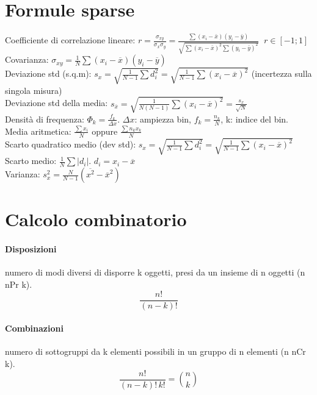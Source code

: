 \documentclass[11pt]{article}
\begin{document}
    \tableofcontents
    \newpage

    \section{Formule sparse}

    Coefficiente di correlazione lineare: $ r = \frac{\sigma_{xy}}{\sigma_x \sigma_y} =
    \frac{\sum (x_i - \bar{x})(y_i - \bar{y})}{\sqrt {\sum (x_i  - \bar{x})^2 \sum (y_i - \bar{y})^2}} \; \; r \in [-1 ; 1] $ \hfill \\[.7\baselineskip]
    Covarianza: $ \sigma_{xy} = \frac{1}{N} \sum (x_i - \overline{x})(y_i - \overline{y}) $ \hfill \\[.7\baselineskip]
    Deviazione std (s.q.m): $s_x = \sqrt {\frac{1}{N-1} \sum d_i^2} = \sqrt {\frac{1}{N-1} \sum (x_i - \overline{x})^2}$
    (incertezza sulla singola misura) \hfill \\[.7\baselineskip]
    Deviazione std della media: $s_{\overline{x}} = \sqrt {\frac{1}{N(N-1)} \sum (x_i - \overline{x})^2} = \frac{s_x}{\sqrt {N}} $ \hfill \\[.7\baselineskip]
    Densità di frequenza: $\varPhi_{k} = \frac{f_{k}}{\Delta x}$. $\Delta x$: ampiezza bin, $f_k = \frac{n_k}{N}$, k: indice del bin. \hfill \\[.7\baselineskip]
    Media aritmetica: $\frac{\sum x_i}{N}$ oppure $\frac{\sum n_kx_k}{N}$ \hfill \\[.7\baselineskip]
    Scarto quadratico medio (dev std): $s_x = \sqrt {\frac{1}{N-1} \sum d_i^2} = \sqrt {\frac{1}{N-1} \sum (x_i - \overline{x})^2}$ \hfill \\[.7\baselineskip]
    Scarto medio: $\frac{1}{N} \sum |d_i|$. $d_i = x_i - \overline{x}$ \hfill \\[.7\baselineskip]
    Varianza: $s_x^2 = \frac{N}{N-1}(\overline{x^2} - \overline{x}^2) $


    \section{Calcolo combinatorio}

    \paragraph{Disposizioni}numero di modi diversi di disporre k oggetti, presi da un insieme di n oggetti (n nPr k).
    \[ \frac{n!}{(n - k)!} \]

    \paragraph{Combinazioni}numero di sottogruppi da k elementi possibili in un gruppo di n elementi (n nCr k).
    \[ \frac{n!}{(n - k)! \, k!} = \binom{n}{k} \]
\end{document}
